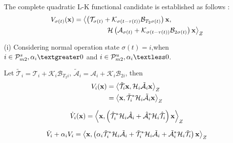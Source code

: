 \documentclass[twocolumn]{autart}    %
\begin{document}
\begin{pf}
    The complete quadratic L-K functional candidate is established as follows :
    \begin{equation}
        \begin{aligned}
            \setlength{\arraycolsep}{0.9pt}
            &V_{\sigma(t)}(\bold{x}) = \left \langle \left(\mathcal{T}_{\sigma(t)}+\mathcal{K}_{\sigma(t-\tau(t))}\mathcal{B}_{T_{2}\sigma(t)}\right)\bold{x}, \right. \\
            & \quad \quad \quad \quad \quad \quad \quad\left.\quad \mathcal{H}\left(\mathcal{A}_{\sigma(t)}+\mathcal{K}_{\sigma(t-\tau(t))}\mathcal{B}_{2\sigma(t)}\right)\bold{x} \right \rangle_{Z}
        \end{aligned}
    \end{equation}


    (i) Considering normal operation state $\sigma(t) = i$,when $ i\in \mathcal{P}_{m2}^{s},\alpha_{i} \textgreater0$ and $i \in \mathcal{P}_{m2}^{u},\alpha_{i} \textless0$. 

    Let $\tilde{\mathcal{T}}_{i} = \mathcal{T}_{i}+\mathcal{K}_{i}\mathcal{B}_{T_{2}i}$, $\tilde{\mathcal{A}}_{i} = \mathcal{A}_{i}+\mathcal{K}_{i}\mathcal{B}_{2i}$, then
\begin{equation}
    \begin{aligned}
        \setlength{\arraycolsep}{0.9pt}
        V_{i}(\bold{x}) & = \left \langle \tilde{\mathcal{T}}_{i}\bold{x},\mathcal{H}_{i}\tilde{\mathcal{A}}_{i}\bold{x} \right \rangle_{Z}\\
    & = \left \langle \bold{x},\tilde{\mathcal{T}}_{i}^{*}\mathcal{H}_{i}\tilde{\mathcal{A}}_{i}\bold{x} \right \rangle_{Z}
    \end{aligned}
\end{equation}

\begin{equation}
    \begin{aligned}
        \setlength{\arraycolsep}{0.9pt}
        \dot{V}_{i}(\bold{x})  = \left \langle \bold{x},\left(\hat{\mathcal{T}}_{i}^{*}\mathcal{H}_{i}\hat{\mathcal{A}}_{i}+\hat{\mathcal{A}}_{i}^{*}\mathcal{H}_{i}\hat{\mathcal{T}}_{i}\right)\bold{x} \right \rangle_{Z}
    \end{aligned}
\end{equation}

\begin{equation}
    \begin{aligned}
        \setlength{\arraycolsep}{0.9pt}
        \dot{V}_{i}+\alpha_{i} V_{i}  = \left \langle \bold{x},\left(\alpha_{i}\tilde{\mathcal{T}}_{i}^{*}\mathcal{H}_{i}\tilde{\mathcal{A}}_{i}+\tilde{\mathcal{T}}_{i}^{*}\mathcal{H}_{i}\tilde{\mathcal{A}}_{i}+\tilde{\mathcal{A}}_{i}^{*}\mathcal{H}_{i}\tilde{\mathcal{T}}_{i}\right)\bold{x} \right \rangle_{Z}
\end{aligned}
\end{equation}



\end{pf}
\end{document}
